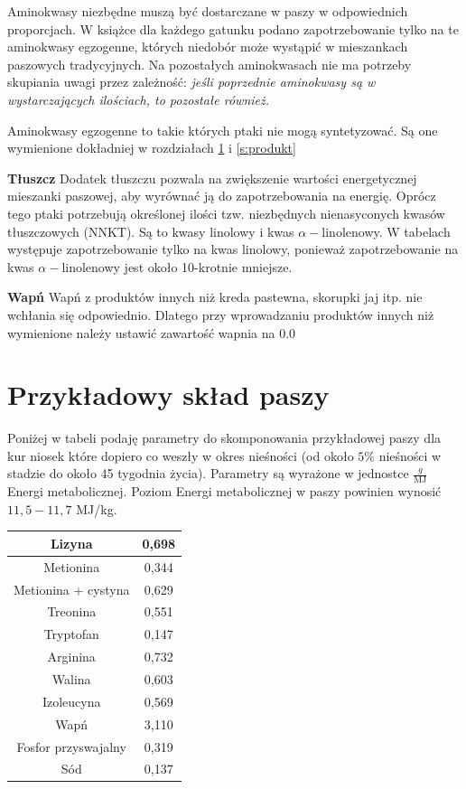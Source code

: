\documentclass[shortabstract]{iithesis}
\begin{document}
Aminokwasy niezbędne muszą być dostarczane w paszy w odpowiednich proporcjach.
W książce \cite{ZZ} dla każdego gatunku podano zapotrzebowanie tylko na te aminokwasy egzogenne, których niedobór może wystąpić w mieszankach paszowych tradycyjnych.
Na pozostałych aminokwasach nie ma potrzeby skupiania uwagi przez zależność: \textit{jeśli poprzednie aminokwasy są w wystarczających ilościach, to pozostałe również.}

Aminokwasy egzogenne to takie których ptaki nie mogą syntetyzować. Są one wymienione dokładniej w rozdziałach \ref{s:pr_sklad} i \ref{s:produkt}


\textbf{Tłuszcz}
Dodatek tłuszczu pozwala na zwiększenie wartości energetycznej mieszanki paszowej, aby wyrównać ją do zapotrzebowania na energię.
Oprócz tego ptaki potrzebują określonej ilości tzw. niezbędnych nienasyconych kwasów tłuszczowych (NNKT). Są to kwasy linolowy i kwas $\alpha-$linolenowy.
W tabelach występuje zapotrzebowanie tylko na kwas linolowy, ponieważ zapotrzebowanie na kwas $\alpha-$linolenowy jest około 10-krotnie mniejsze.


\textbf{Wapń}
Wapń z produktów innych niż kreda pastewna, skorupki jaj itp. nie wchłania się odpowiednio. Dlatego przy wprowadzaniu produktów innych niż wymienione należy ustawić zawartość wapnia na $0.0$ 

\clearpage

\section{Przykładowy skład paszy}\label{s:pr_sklad}

	Poniżej w tabeli podaję parametry do skomponowania przykładowej paszy dla kur niosek które dopiero co weszły w okres nieśności (od około $5\%$ nieśności w stadzie do około 45 tygodnia życia). Parametry są wyrażone w jednostce $\frac{g}{\textrm{MJ}}$ Energi metabolicznej. Poziom Energi metabolicznej w paszy powinien wynosić $11,5-11,7$ MJ/kg.
	
	\begin{tabular}{|c|c|}
		\hline
		Lizyna &0,698 \\
		\hline
		Metionina &0,344 \\
		\hline
		Metionina + cystyna &0,629 \\
		\hline
		Treonina &0,551 \\
		\hline
		Tryptofan &0,147 \\
		\hline
		Arginina &0,732 \\
		\hline
		Walina &0,603 \\
		\hline
		Izoleucyna &0,569 \\
		\hline
		Wapń &3,110 \\
		\hline
		Fosfor przyswajalny &0,319 \\
		\hline
		Sód &0,137 \\
		\hline
	\end{tabular}
	
\end{document}
